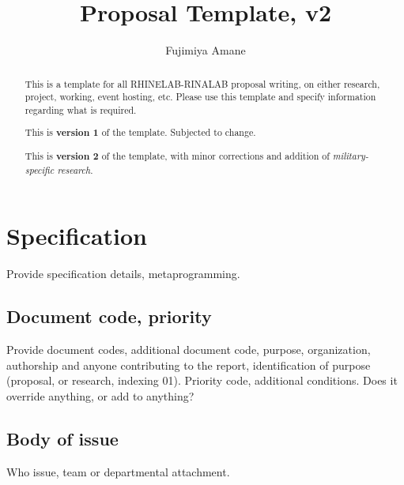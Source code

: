 \documentclass[10pt,a4paper]{article}
\title{\textbf{Proposal Template}, v2} %
\author{Fujimiya Amane} %
\affiliation{} %
\begin{document}
\maketitle

\begin{abstract}
    \noindent
    This is a template for all RHINELAB-RINALAB proposal writing, on either research, project, working, event hosting, etc. Please use this template and specify information regarding what is required.
    
    This is \textbf{version 1} of the template. Subjected to change. 

    This is \textbf{version 2} of the template, with minor corrections and addition of \textit{military-specific research}. 

\end{abstract}

\vspace{2.5cm}



\thispagestyle{firstpage}

\pagebreak


\newgeometry{} %
\setcounter{section}{-1}

\section{Specification}
\label{sec:spec}

Provide specification details, metaprogramming. 

\subsection{Document code, priority}

Provide document codes, additional document code, purpose, organization, authorship and anyone contributing to the report, identification of purpose (proposal, or research, indexing 01). Priority code, additional conditions. Does it override anything, or add to anything?

\subsection{Body of issue}

Who issue, team or departmental attachment. 
\end{document}

